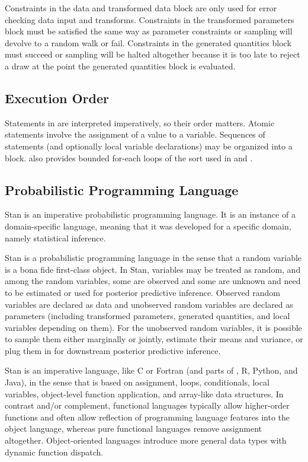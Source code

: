 Constraints in the data and transformed data block are only used for
error checking data input and transforms.  Constraints in the
transformed parameters block must be satisfied the same way as
parameter constraints or sampling will devolve to a random walk or
fail.  Constraints in the generated quantities block must succeed or
sampling will be halted altogether because it is too late to reject
a draw at the point the generated quantities block is evaluated.

\subsection{Execution Order}

Statements in \Stan are interpreted imperatively, so their order
matters.  Atomic statements involve the assignment of a value to a
variable.  Sequences of statements (and optionally local variable
declarations) may be organized into a block.  \Stan also provides bounded
for-each loops of the sort used in \R and \BUGS.



\subsection{Probabilistic Programming Language}

Stan is an imperative probabilistic programming language.  It is an
instance of a domain-specific language, meaning that it was
developed for a specific domain, namely statistical inference.

Stan is a probabilistic programming language in the sense that a
random variable is a bona fide first-class object.  In Stan, variables
may be treated as random, and among the random variables, some are
observed and some are unknown and need to be estimated or used for
posterior predictive inference.  Observed random variables are
declared as data and unobserved random variables are declared as
parameters (including transformed parameters, generated quantities, and
local variables depending on them).  For the unobserved random
variables, it is possible to sample them either marginally or jointly,
estimate their means and variance, or plug them in for downstream
posterior predictive inference.

Stan is an imperative language, like C or Fortran (and parts of \Cpp,
R, Python, and Java), in the sense that is based on assignment, loops,
conditionals, local variables, object-level function application, and
array-like data structures.  In contrast and/or complement, functional
languages typically allow higher-order functions and often allow
reflection of programming language features into the object language,
whereas pure functional languages remove assignment altogether.
Object-oriented languages introduce more general data types with
dynamic function dispatch.

